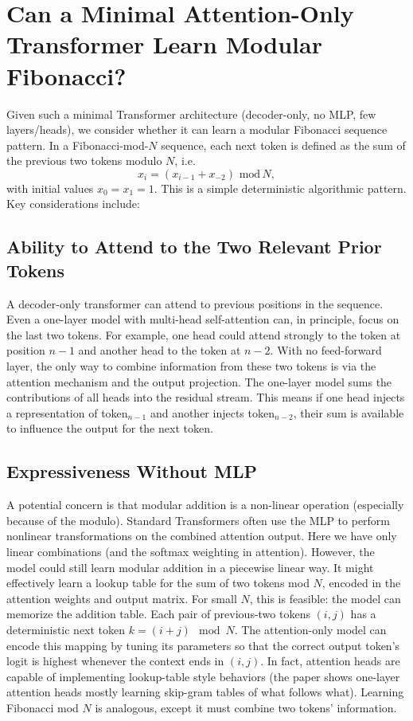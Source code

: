 \documentclass{article}
\begin{document}
\section*{Can a Minimal Attention-Only Transformer Learn Modular Fibonacci?}

Given such a minimal Transformer architecture (decoder-only, no MLP, few layers/heads), we consider whether it can learn a modular Fibonacci sequence pattern. In a Fibonacci-mod-$N$ sequence, each next token is defined as the sum of the previous two tokens modulo $N$, i.e. 
\[x_i = (x_{i-1} + x_{-2})\,\,\text{mod} \,N, \]
with initial values $x_0 = x_1 = 1$.
This is a simple deterministic algorithmic pattern. Key considerations include:

\subsection*{Ability to Attend to the Two Relevant Prior Tokens}
A decoder-only transformer can attend to previous positions in the sequence. Even a one-layer model with multi-head self-attention can, in principle, focus on the last two tokens. For example, one head could attend strongly to the token at position $n-1$ and another head to the token at $n-2$. With no feed-forward layer, the only way to combine information from these two tokens is via the attention mechanism and the output projection. The one-layer model sums the contributions of all heads into the residual stream. This means if one head injects a representation of token$_{n-1}$ and another injects token$_{n-2}$, their sum is available to influence the output for the next token.

\subsection*{Expressiveness Without MLP}
A potential concern is that modular addition is a non-linear operation (especially because of the modulo). Standard Transformers often use the MLP to perform nonlinear transformations on the combined attention output. Here we have only linear combinations (and the softmax weighting in attention). However, the model could still learn modular addition in a piecewise linear way. It might effectively learn a lookup table for the sum of two tokens mod $N$, encoded in the attention weights and output matrix. For small $N$, this is feasible: the model can memorize the addition table. Each pair of previous-two tokens $(i, j)$ has a deterministic next token $k = (i + j) \mod N$. The attention-only model can encode this mapping by tuning its parameters so that the correct output token’s logit is highest whenever the context ends in $(i, j)$. In fact, attention heads are capable of implementing lookup-table style behaviors (the paper shows one-layer attention heads mostly learning skip-gram tables of what follows what). Learning Fibonacci mod $N$ is analogous, except it must combine two tokens' information.
\end{document}
